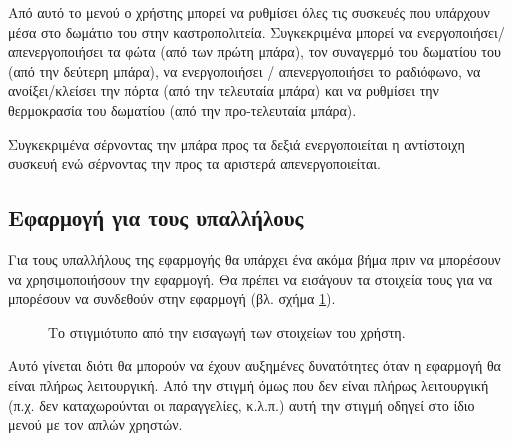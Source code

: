 \documentclass{assignment}
\begin{document}
Από αυτό το μενού ο χρήστης μπορεί να ρυθμίσει όλες τις συσκευές που υπάρχουν μέσα στο δωμάτιο του στην καστροπολιτεία. Συγκεκριμένα μπορεί να ενεργοποιήσει/απενεργοποιήσει τα φώτα (από των πρώτη μπάρα), τον συναγερμό του δωματίου του (από την δεύτερη μπάρα), να ενεργοποιήσει / απενεργοποιήσει το ραδιόφωνο, να ανοίξει/κλείσει την πόρτα (από την τελευταία μπάρα) και να ρυθμίσει την θερμοκρασία του δωματίου (από την προ-τελευταία μπάρα).

Συγκεκριμένα σέρνοντας την μπάρα προς τα δεξιά ενεργοποιείται η αντίστοιχη συσκευή ενώ σέρνοντας την προς τα αριστερά απενεργοποιείται.

\subsection{Εφαρμογή για τους υπαλλήλους}

Για τους υπαλλήλους της εφαρμογής θα υπάρχει ένα ακόμα βήμα πριν να μπορέσουν να χρησιμοποιήσουν την εφαρμογή. Θα πρέπει να εισάγουν τα στοιχεία τους για να μπορέσουν να συνδεθούν στην εφαρμογή (βλ. σχήμα \ref{fig:admin}).

\begin{figure}
\begin{center}
\caption{Το στιγμιότυπο από την εισαγωγή των στοιχείων του χρήστη.}
\label{fig:admin}
\end{center}
\end{figure}

Αυτό γίνεται διότι θα μπορούν να έχουν αυξημένες δυνατότητες όταν η εφαρμογή θα είναι πλήρως λειτουργική. Από την στιγμή όμως που δεν είναι πλήρως λειτουργική (π.χ. δεν καταχωρούνται οι παραγγελίες, κ.λ.π.) αυτή την στιγμή οδηγεί στο ίδιο μενού με τον απλών χρηστών.
\end{document}
